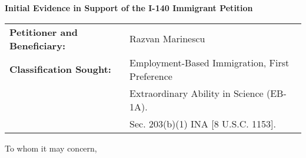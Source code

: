 \documentclass[11pt]{article}
\begin{document}
\begin{center}
 \Large{\textbf{Initial Evidence in Support of the I-140 Immigrant Petition}}
\end{center}

\vspace{4em}


\begin{tabular}{ll}
\textbf{Petitioner and Beneficiary:} & Razvan Marinescu\\
\textbf{Classification Sought:} & Employment-Based Immigration, First Preference\\
& Extraordinary Ability in Science (EB-1A).\\
& Sec. 203(b)(1) INA [8 U.S.C. 1153].\\
\end{tabular}

\vspace{2em}


To whom it may concern,

\vspace{2em}



\newcommand{\fie}{Biostatistics and Computational Biology}
\newcommand{\dr}{Dr. Wang }
\newcommand{\drs}{Dr. Wang's }

\newcommand{\qu}[1]{\say{\emph{#1}}}

\newcommand{\pg}{(QR, Professor of EECS, MIT)\\}
\newcommand{\ty}{(UZ, Professor of Electrical and Computer Engineering, Univ A)\\}
\newcommand{\fb}{(GC, Professor of Neuroradiology, University of ABC)\\}
\newcommand{\se}{(TF, Professor of Neuropsychology, XYZ)\\}
\newcommand{\sh}{(TI, Vice President of M, Company XYZ, USA)\\}
\newcommand{\ch}{(DI, Senior Director of XYZ, Company ABC, USA)\\}
\newcommand{\eb}{(FC, Professor at UV)\\}
\end{document}
